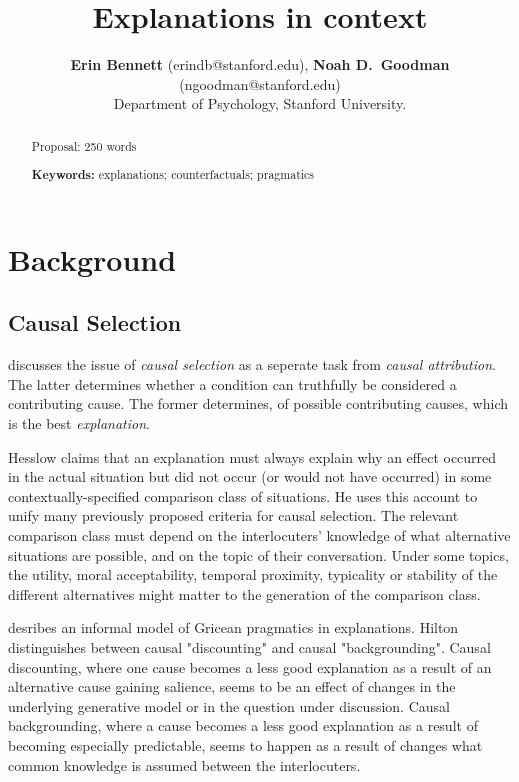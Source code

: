 \documentclass[10pt,letterpaper]{article}
\title{Explanations in context}
\author{{\large \bf Erin Bennett} (erindb@stanford.edu), {\large \bf Noah D.~Goodman} (ngoodman@stanford.edu)\\
  Department of Psychology, Stanford University.}
\begin{document}
\maketitle

\begin{abstract}

Proposal: 250 words

\textbf{Keywords:} 
explanations; counterfactuals; pragmatics
\end{abstract}

\section{Background}

\subsection{Causal Selection}

 discusses the issue of \emph{causal selection} as a seperate task from \emph{causal attribution}.
The latter determines whether a condition can truthfully be considered a contributing cause.
The former determines, of possible contributing causes, which is the best \emph{explanation}.

Hesslow claims that an explanation must always explain why an effect occurred in the actual situation but did not occur (or would not have occurred) in some contextually-specified comparison class of situations.
He uses this account to unify many previously proposed criteria for causal selection. %
The relevant comparison class must depend on the interlocuters' knowledge of what alternative situations are possible, and on the topic of their conversation.
Under some topics, the utility, moral acceptability, temporal proximity, typicality or stability of the different alternatives might matter to the generation of the comparison class.

 desribes an informal model of Gricean pragmatics in explanations.
Hilton distinguishes between causal "discounting" and causal "backgrounding". Causal discounting, where one cause becomes a less good explanation as a result of an alternative cause gaining salience, seems to be an effect of changes in the underlying generative model or in the question under discussion. Causal backgrounding, where a cause becomes a less good explanation as a result of becoming especially predictable, seems to happen as a result of changes what common knowledge is assumed between the interlocuters.



\setlength{\bibleftmargin}{.125in}
\setlength{\bibindent}{-\bibleftmargin}


\end{document}
